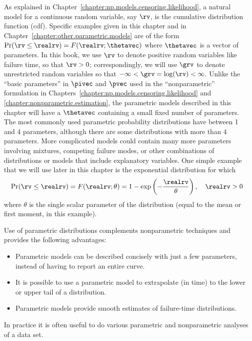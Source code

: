 As explained in Chapter~\ref{chapter:np.models.censoring.likelihood},
a natural model for a continuous random variable, say $\rv$, is the
cumulative distribution function (cdf).  Specific examples given in
this chapter and in Chapter~\ref{chapter:other.parametric.models}
are of the form
$\Pr(\rv \leq \realrv)=F(\realrv;\thetavec)$
where $\thetavec$ is a vector of parameters.
In this book, we use $\rv$ to denote positive random variables 
like failure time, 
so that $\rv>0$; correspondingly, we will use $\grv$ 
to denote unrestricted random variables so that $-\infty <
\grv=\log(\rv) < \infty$.  Unlike the ``basic parameters'' in $\pivec$
and $\pvec$ used in the ``nonparametric'' formulation in
Chapters~\ref{chapter:np.models.censoring.likelihood} and
\ref{chapter:nonparametric.estimation}, the parametric models
described in this chapter will have a $\thetavec$ containing a small
fixed number of parameters. The most commonly used parametric
probability distributions have between 1 and 4 parameters, although
there are some distributions with more than 4 parameters.  More
complicated models could contain many more parameters involving
mixtures, competing failure modes, or other combinations of
distributions or models that include explanatory variables.  One
simple example that we will use later in this chapter is the
exponential distribution for which
\begin {equation}
\label{equation:expo.definition}
\Pr(\rv \leq \realrv)=F(\realrv;\theta) = 
1 - \exp \left( - \frac{\realrv}{\theta} \right), \quad \realrv > 0
\end {equation}
where $\theta$ is the single scalar parameter of the distribution
(equal to the mean or first moment, in this example).

Use of parametric distributions complements nonparametric
techniques and provides the following advantages:
\begin{itemize}
\item
Parametric models can be described concisely with just a few
parameters, instead of having to report an entire curve.
\item
It is possible to use a parametric model to extrapolate (in time)
to the lower or upper tail of a distribution.
\item
Parametric models provide smooth estimates of failure-time distributions.
\end{itemize}
In practice it is often useful to do various parametric and nonparametric
analyses of a data set.


